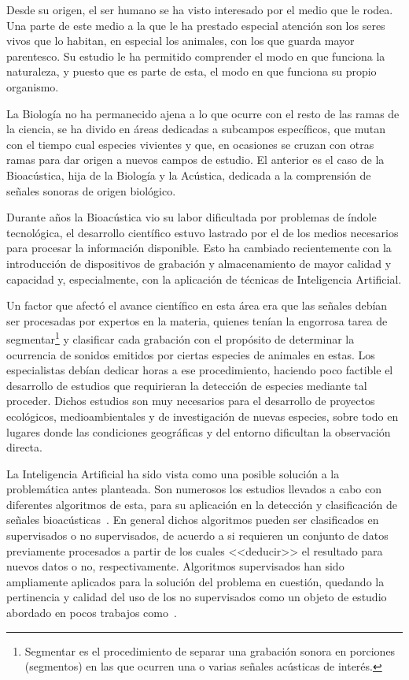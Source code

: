 Desde su origen, el ser humano se ha visto interesado por el medio que le rodea.
Una parte de este medio a la que le ha prestado especial atención son los seres vivos que lo habitan, en especial los animales, con los que guarda mayor parentesco.
Su estudio le ha permitido comprender el modo en que funciona la naturaleza, y puesto que es parte de esta, el modo en que funciona su propio organismo.

La Biología no ha permanecido ajena a lo que ocurre con el resto de las ramas de la ciencia, se ha divido en áreas dedicadas a subcampos específicos, que mutan con el tiempo cual especies vivientes y que, en ocasiones se cruzan con otras ramas para dar origen a nuevos campos de estudio.
El anterior es el caso de la Bioacústica, hija de la Biología y la Acústica, dedicada a la comprensión de señales sonoras de origen biológico.

Durante años la Bioacústica vio su labor dificultada por problemas de índole tecnológica, el desarrollo científico estuvo lastrado por el de los medios necesarios para procesar la información disponible.
Esto ha cambiado recientemente con la introducción de dispositivos de grabación y almacenamiento de mayor calidad y capacidad y, especialmente, con la aplicación de técnicas de Inteligencia Artificial.

Un factor que afectó el avance científico en esta área era que las señales debían ser procesadas por expertos en la materia, quienes tenían la engorrosa tarea de segmentar\footnote{Segmentar es el procedimiento de separar una grabación sonora en porciones (segmentos) en las que ocurren una o varias señales acústicas de interés.} y clasificar cada grabación con el propósito de determinar la ocurrencia de sonidos emitidos por ciertas especies de animales en estas.
Los especialistas debían dedicar horas a ese procedimiento, haciendo poco factible el desarrollo de estudios que requirieran la detección de especies mediante tal proceder.
Dichos estudios son muy necesarios para el desarrollo de proyectos ecológicos, medioambientales y de investigación de nuevas especies, sobre todo en lugares donde las condiciones geográficas y del entorno dificultan la observación directa.

La Inteligencia Artificial ha sido vista como una posible solución a la problemática antes planteada.
Son numerosos los estudios llevados a cabo con diferentes algoritmos de esta, para su aplicación en la detección y clasificación de señales bioacústicas~\cite{Gerhard03}.
En general dichos algoritmos pueden ser clasificados en supervisados o no supervisados, de acuerdo a si requieren un conjunto de datos previamente procesados a partir de los cuales <<deducir>> el resultado para nuevos datos o no, respectivamente.
Algoritmos supervisados han sido ampliamente aplicados para la solución del problema en cuestión, quedando la pertinencia y calidad del uso de los no supervisados como un objeto de estudio abordado en pocos trabajos como~\cite{Jancovic13}.


